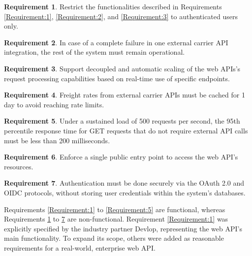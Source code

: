 \documentclass[12pt,reqno, oneside]{amsbook}
\theoremstyle{definition}
\theoremstyle{definition}
\newtheorem{requirement}{Requirement}
\numberwithin{section}{chapter}
\numberwithin{table}{chapter}
\numberwithin{figure}{chapter}
\begin{document}
\begin{requirement}
  \label{Requirement:6}
  Restrict the functionalities described in Requirements \ref{Requirement:1}, \ref{Requirement:2}, and \ref{Requirement:3} to authenticated users only.
\end{requirement}

\begin{requirement}
  \label{Requirement:7}
  In case of a complete failure in one external carrier \ac{API} integration, the rest of the system must remain operational.
\end{requirement}

\begin{requirement}
  \label{Requirement:8}
  Support decoupled and automatic scaling of the web \acp{API}'s request processing capabilities based on real-time use of specific endpoints.
\end{requirement}

\begin{requirement}
  \label{Requirement:9}
  Freight rates from external carrier \acp{API} must be cached for 1 day to avoid reaching rate limits.
\end{requirement}

\begin{requirement}
  \label{Requirement:10}
  Under a sustained load of 500 requests per second, the 95th percentile response time for GET requests that do not require external \ac{API} calls must be less than 200 milliseconds.
\end{requirement}

\begin{requirement}
  \label{Requirement:11}
  Enforce a single public entry point to access the web \ac{API}'s resources.
\end{requirement}

\begin{requirement}
  \label{Requirement:12}
  Authentication must be done securely via the \ac{OAuth} 2.0 and \ac{OIDC} protocols, without storing user credentials within the system's databases.
\end{requirement}


Requirements \ref{Requirement:1} to \ref{Requirement:5} are functional, whereas Requirements \ref{Requirement:6} to \ref{Requirement:12} are non-functional. Requirement \ref{Requirement:1} was explicitly specified by the industry partner Devlop, representing the web \ac{API}'s main functionality. To expand its scope, others were added as reasonable requirements for a real-world, enterprise web \ac{API}.
\end{document}

